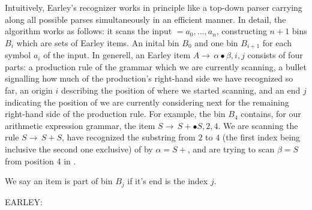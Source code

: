 \begin{isabellebody}
\begin{isamarkuptext}
Intuitively, Earley's recognizer works in principle like a top-down parser carrying along all possible
parses simultaneously in an efficient manner.
In detail, the algorithm works as follows: it scans the input \isa{{\isasymomega}} $=a_0,\dots,a_n$, constructing
$n+1$ bins $B_i$ which are sets of Earley items. An inital bin $B_0$ and one bin $B_{i+1}$ for
each symbol $a_i$ of the input.
In generell, an Earley item $A \rightarrow \, \alpha \bullet \beta, i, j$ consists of four parts: a production rule of the grammar which we are currently
scanning, a bullet signalling how much of the production's right-hand side we have recognized so far,
an origin $i$ describing the position of \isa{{\isasymomega}} where we started scanning, and an end $j$ indicating
the position  of \isa{{\isasymomega}} we are currently considering next for the remaining right-hand side of the production rule.
For example, the bin $B_4$ contains, for our arithmetic expression grammar, the item $S \rightarrow \, S + \bullet S, 2, 4$.
We are scanning the rule $S \rightarrow \, S + S$, have recognized the substring from $2$ to $4$ (the first index being
inclusive the second one exclusive) of \isa{{\isasymomega}} by $\alpha = S +$, and are trying to scan $\beta = S$ from position 4 in \omega. 

We say an item is part of bin $B_j$ if it's end is the index $j$.%
\end{isamarkuptext}\isamarkuptrue%
%
\begin{isamarkuptext}%
EARLEY:


\end{isamarkuptext}
\end{isabellebody}
